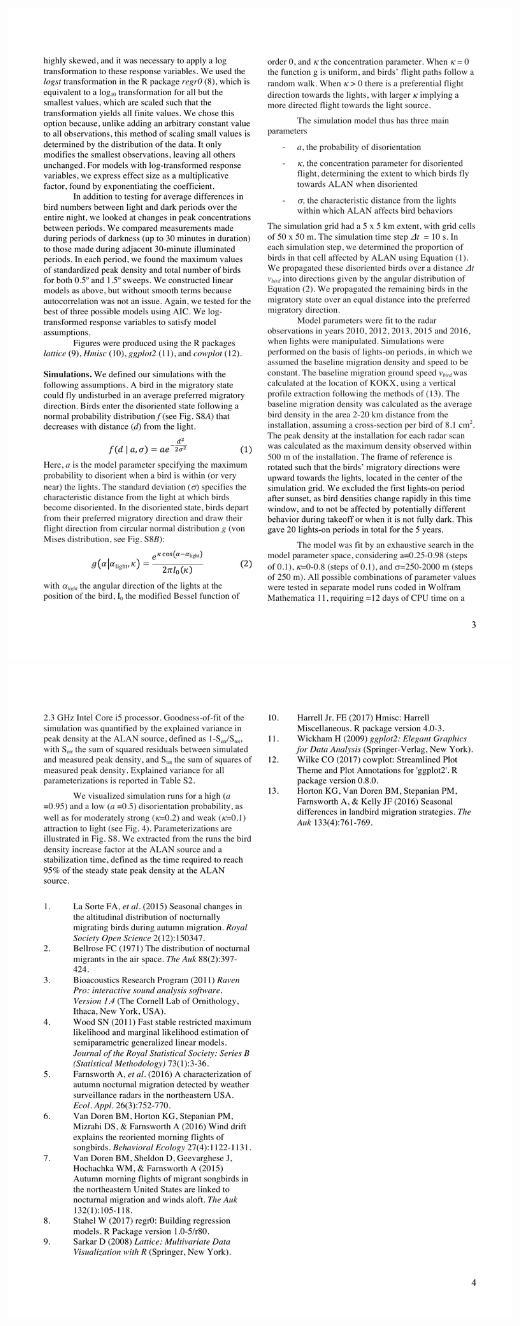 \documentclass[a4paper, twoside]{templates/ociamthesis}
\begin{document}
\includegraphics[width=1\linewidth]{pdf_chapters/lights/lights_supp_crop_Part07}
\includegraphics[width=1\linewidth]{pdf_chapters/lights/lights_supp_crop_Part08}
\end{document}
